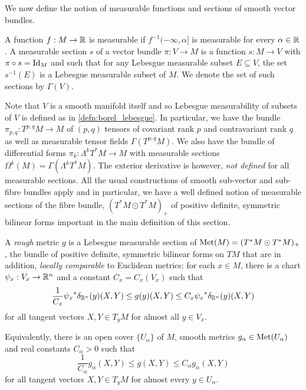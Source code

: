 \documentclass[a4paper, 12pt]{amsart}
\begin{document}
We now define the notion of measurable functions and sections of smooth vector bundles.

\begin{defn}
A function $f: M \to \mathbb{R}$ is measurable if $f^{-1}(-\infty, \alpha]$ is measurable for every $\alpha  \in \mathbb{R}$. A measurable section \(s\) of a vector bundle \(\pi : V \to M\) is a function \(s: M \to V\) with \(\pi \circ s = \operatorname{Id}_M\) and such that for any Lebesgue measurable subset \(E \subseteq V\), the set \(s^{-1}(E)\) is a Lebesgue measurable subset of \(M\).  We denote the set of such sections by $\Gamma(V)$.
\end{defn}

Note that \(V\) is a smooth manifold itself and so Lebesgue measurability of subsets of \(V\) is defined as in \ref{defn:borel_lebesgue}. In particular, we have the bundle $\pi_{p,q} : T^{p,q}M \to M$ of $(p,q)$ tensors of covariant rank $p$ and contravariant rank $q$ as well as measurable tensor fields \(\Gamma(T^{p,q}M)\). We also have the bundle of differential forms \(\pi_k : \Lambda^k T^{\ast} M \to M\) with measurable sections \(\Omega^k(M) = \Gamma(\Lambda^k T^{\ast} M)\). The exterior derivative is however, \emph{not defined} for all measurable sections. All the usual constructions of smooth sub-vector and sub-fibre bundles apply and in particular, we have a well defined notion of measurable sections of the fibre bundle, \((T^{\ast} M \odot T^{\ast} M)_+\) of positive definite, symmetric bilinear forms important in the main definition of this section.

\begin{defn}
\label{defn:rough_metric}
A \emph{rough} metric \(g\) is a Lebesgue measurable section of \(\operatorname{Met}(M) = (T^{\ast} M \odot T^{\ast} M)_+\), the bundle of positive definite, symmetric bilinear forms on \(TM\) that are in addition, \emph{locally comparable} to Euclidean metrics:
for each $x \in M$, there is a chart $\psi_x:V_x \to \mathbb{R}^n$ and a constant $C_x = C_x(V_x)$ such that
\[
\frac{1}{C_{x}} {\psi_x}^\ast\delta_{\mathbb{R}^n}(y) (X, Y) \leq g(y)(X, Y) \leq C_{x} {\psi_x}^\ast\delta_{\mathbb{R}^n}(y) (X, Y)
\]
for all tangent vectors \(X, Y \in T_yM\) for almost all $y \in V_x$. 
\end{defn}

\begin{rem}
Equivalently, there is an open cover \(\lbrace U_{\alpha} \rbrace\) of \(M\), smooth metrics \(g_{\alpha} \in \operatorname{Met}(U_{\alpha})\) and real constants \(C_{\alpha} > 0\) such that
\[
\frac{1}{C_{\alpha}} g_{\alpha} (X, Y) \leq g(X, Y) \leq C_{\alpha} g_{\alpha} (X, Y)
\]
for all tangent vectors \(X, Y \in T_yM\) for almost every $y \in U_\alpha$.
\end{rem}
\end{document}
